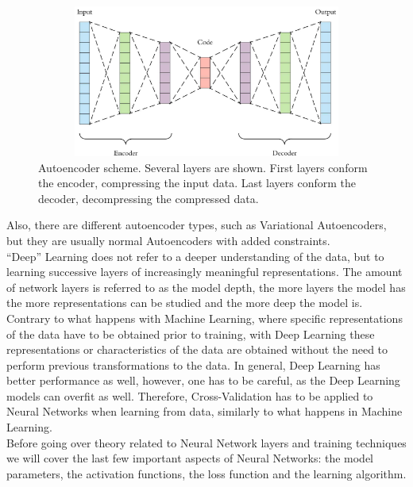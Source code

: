 \begin{figure}[h!]
  \begin{center}
    \includegraphics[width=120mm, height=50mm]{Figuras/Autoencoder.png}\par
    \caption{Autoencoder scheme. Several layers are shown. First layers conform the encoder, compressing the input data. Last layers conform the decoder, decompressing the compressed data.}
    \label{fig:Autoencoder}
  \end{center}
\end{figure}

Also, there are different autoencoder types, such as Variational Autoencoders, but they are usually normal Autoencoders with added constraints.\\

``Deep'' Learning does not refer to a deeper understanding of the data, but to learning successive layers of increasingly meaningful representations. The amount of network layers is referred to as the model depth, the more layers the model has the more representations can be studied and the more deep the model is. Contrary to what happens with Machine Learning, where specific representations of the data have to be obtained prior to training, with Deep Learning these representations or characteristics of the data are obtained without the need to perform previous transformations to the data. In general, Deep Learning has better performance as well, however, one has to be careful, as the Deep Learning models can overfit as well. Therefore, Cross-Validation has to be applied to Neural Networks when learning from data, similarly to what happens in Machine Learning.\\

Before going over theory related to Neural Network layers and training techniques we will cover the last few important aspects of Neural Networks: the model parameters, the activation functions, the loss function and the learning algorithm.\\ 


